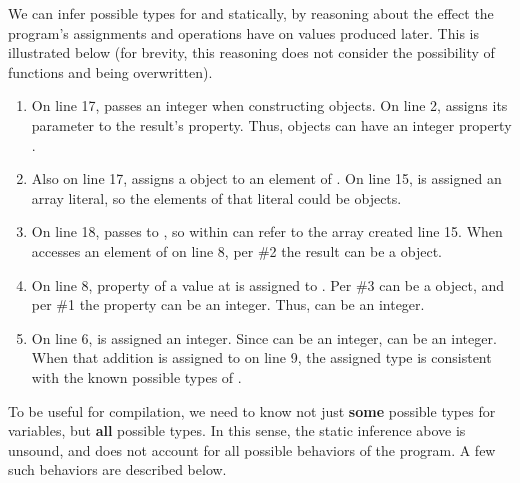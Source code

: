 We can infer possible types for  and  statically,
by reasoning about the effect the program's assignments
and operations have on values produced later.
This is illustrated below (for brevity, this reasoning does not consider
the possibility of functions  and  being overwritten).

\begin{enumerate}
\item On line 17,  passes an integer when constructing 
      objects. On line 2,  assigns its parameter to the result's
       property. Thus,  objects can have an
      integer property .
\item Also on line 17,  assigns a  object to an element
      of . On line 15,  is assigned an array literal,
      so the elements of that literal could be  objects.
\item On line 18,  passes  to , so 
      within  can refer to the array created line 15.
      When  accesses an element of  on line 8,
      per \#2 the result can be a  object.
\item On line 8, property  of a value at  is assigned to .
      Per \#3  can be a  object, and per \#1 the
       property can be an integer. Thus,  can be an integer.
\item On line 6,  is assigned an integer. Since  can be
      an integer,  can be an integer.
      When that addition is assigned to  on line 9, the assigned
      type is consistent with the known possible types of .
\end{enumerate}

To be useful for compilation, we need to know not just {\bf some}
possible types for variables, but {\bf all} possible types.
In this sense, the static inference above is unsound, and does not account
for all possible behaviors of the program.
A few such behaviors are described below.

